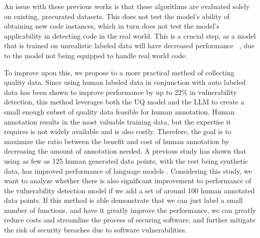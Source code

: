 An issue with these previous works is that these algorithms are evaluated solely on existing, precurated datasets. This does not test the model's ability of obtaining new code instances, which in turn does not test the model's applicability in detecting code in the real world. This is a crucial step, as a model that is trained on unrealistic labeled data will have decreased performance ~\cite{jimenez2019importance}, due to the model not being equipped to handle real world code.

To improve upon this, we propose to a more practical method of collecting quality data. Since using human labeled data in conjunction with auto labeled data has been shown to improve performance by up to 22\% \cite{le2024automatic} in vulnerability detection, this method leverages both the UQ model and the LLM to create a small enough subset of quality data feasible for human annotation. Human annotation results in the most valuable training data, but the expertise it requires is not widely available and is also costly. Therefore, the goal is to maximize the ratio between the benefit and cost of human annotation by decreasing the amount of annotation needed. A previous study has shown that using as few as 125 human generated data points, with the rest being synthetic data, has improved performance of language models \cite{ashok2024little}. Considering this study, we want to analyze whether there is also significant improvement to performance of the vulnerability detection model if we add a set of around 100 human annotated data points. If this method is able demonstrate that we can just label a small number of functions, and have it greatly improve the performance, we can greatly reduce costs and streamline the process of securing software, and further mitigate the risk of security breaches due to software vulnerabilities.


\done{}
\done{}
